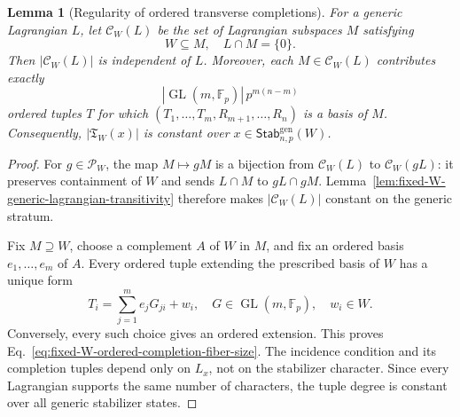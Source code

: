 \documentclass[11pt]{article}
\newcommand{\F}{\mathbb F}
\newcommand{\1}{\mathbf 1}
\theoremstyle{plain}
\newtheorem{lemma}[theorem]{Lemma}
\theoremstyle{definition}
\theoremstyle{remark}
\begin{document}
\begin{lemma}[Regularity of ordered transverse completions]
\label{lem:fixed-W-ordered-completion-regularity}
For a generic Lagrangian $L$, let $\mathcal C_W(L)$ be the set of Lagrangian
subspaces $M$ satisfying
\begin{equation}
 W\subseteq M,\quad L\cap M=\{0\}.
 \label{eq:fixed-W-frame-level-completions}
\end{equation}
Then $|\mathcal C_W(L)|$ is independent of $L$.  Moreover, each
$M\in\mathcal C_W(L)$ contributes exactly
\begin{equation}
 |\operatorname{GL}(m,\F_p)|\,p^{m(n-m)}
 \label{eq:fixed-W-ordered-completion-fiber-size}
\end{equation}
ordered tuples $T$ for which
$(T_1,\ldots,T_m,R_{m+1},\ldots,R_n)$ is a basis of $M$.  Consequently,
$|\mathfrak T_W(x)|$ is constant over
$x\in\mathsf{Stab}_{n,p}^{\mathrm{gen}}(W)$.
\end{lemma}
\begin{proof}
For $g\in\mathcal P_W$, the map $M\mapsto gM$ is a bijection from
$\mathcal C_W(L)$ to $\mathcal C_W(gL)$: it preserves containment of $W$ and
sends $L\cap M$ to $gL\cap gM$.  Lemma~\ref{lem:fixed-W-generic-lagrangian-transitivity}
therefore makes $|\mathcal C_W(L)|$ constant on the generic stratum.

Fix $M\supseteq W$, choose a complement $A$ of $W$ in $M$, and fix an ordered
basis $e_1,\ldots,e_m$ of $A$.  Every ordered tuple extending the prescribed
basis of $W$ has a unique form
\begin{equation}
 T_i=\sum_{j=1}^m e_jG_{ji}+w_i,
 \quad G\in\operatorname{GL}(m,\F_p),\quad w_i\in W.
 \label{eq:fixed-W-ordered-completion-parametrization}
\end{equation}
Conversely, every such choice gives an ordered extension.  This proves
Eq.~\eqref{eq:fixed-W-ordered-completion-fiber-size}.  The incidence condition
and its completion tuples depend only on $L_x$, not on the stabilizer
character.  Since every Lagrangian supports the same number of characters,
the tuple degree is constant over all generic stabilizer states.
\end{proof}
\end{document}
